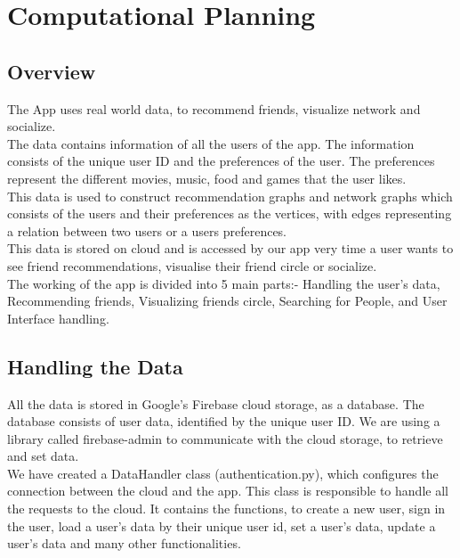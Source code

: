 \documentclass[11pt]{report}
\begin{document}
\chapter{Computational Planning}

\section{Overview}

The App uses real world data, to recommend friends, visualize network and socialize. \\

The data contains information of all the users of the app. The information consists of the unique user ID and the preferences of the user. The preferences represent the different movies, music, food and games that the user likes. \\

This data is used to construct recommendation graphs and network graphs which consists of the users and their preferences as the vertices, with edges representing a relation between two users or a users preferences. \\

This data is stored on cloud and is accessed by our app very time a user wants to see friend recommendations, visualise their friend circle or socialize. \\

The working of the app is divided into 5 main parts:- Handling the user's data, Recommending friends, Visualizing friends circle, Searching for People, and User Interface handling. 

\newpage 

\section{Handling the Data}

All the data is stored in Google's Firebase cloud storage, as a database. The database consists of user data, identified by the unique user ID. We are using a library called firebase-admin to communicate with the cloud storage, to retrieve and set data.\\

We have created a DataHandler class (authentication.py), which configures the connection between the cloud and the app. This class is responsible to handle all the requests to the cloud. It contains the functions, to create a new user, sign in the user, load a user's data by their unique user id, set a user's data, update a user's data and many other functionalities. \\
\end{document}
